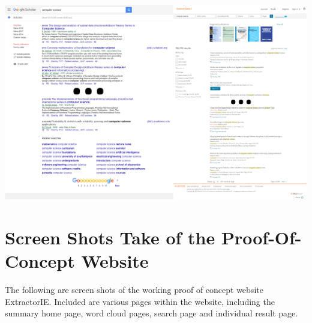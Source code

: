 \begin{appendices}
\includegraphics[width=\textwidth]{img/searchexamples.png}

\chapter{Screen Shots Take of the Proof-Of-Concept Website}
\label{appendix:extractorie}
The following are screen shots of the working proof of concept website ExtractorIE. Included are various pages within the website, including the summary home page, word cloud pages, search page and individual result page. \\


\end{appendices}
